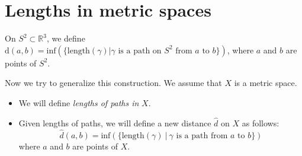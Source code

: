 \section{Lengths in metric spaces}

On $S^2 \subset \mathbb{R}^3$, we define $\mathrm{d}(a,b) = \text{inf}\left( \{ \text{length}(\gamma) | \gamma \text{ is a path on } S^2 \text{ from } a \text{ to } b \} \right)$, where $a$ and $b$ are points of $S^2$.

\noindent Now we try to generalize this construction. We assume that $X$ is a metric space.

\begin{itemize}
  \item We will define \emph{lengths of paths in} $X$.
  \item Given lengths of paths, we will define a new distance $\hat{d}$ on $X$ as follows:
  $$\hat{d}(a,b) = \text{inf}\left( \{ \text{length}(\gamma) \ | \ \gamma \text{ is a path from } a \text{ to } b \} \right)$$
  where $a$ and $b$ are points of $X$.
\end{itemize}
